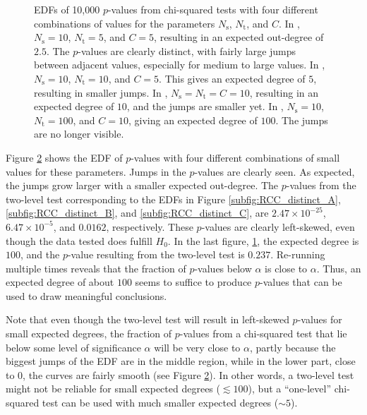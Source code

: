 \begin{figure}[h]
\begin{subfigure}[b]{0.49\textwidth}
    \label{subfig:RCC_distinct_D}
\end{subfigure}
    \caption[The effect of small parameter values on the EDF of $p$-values]{EDFs of 10,000 $p$-values from chi-squared tests with four different combinations of values for the parameters $N_\text{s}$, $N_\text{t}$, and $C$. In , $N_\text{s} = 10$, $N_\text{t} = 5$, and $C = 5$, resulting in an expected out-degree of $2.5$. The $p$-values are clearly distinct, with fairly large jumps between adjacent values, especially for medium to large values. In , $N_\text{s} = 10$, $N_\text{t} = 10$, and $C = 5$. This gives an expected degree of $5$, resulting in smaller jumps. In , $N_\text{s} = N_\text{t} = C = 10$, resulting in an expected degree of $10$, and the jumps are smaller yet. In , $N_\text{s} = 10$, $N_\text{t} = 100$, and $C = 10$, giving an expected degree of $100$. The jumps are no longer visible.}
  \label{fig:RCC_distinct}
\end{figure}
Figure \ref{fig:RCC_distinct} shows the EDF of $p$-values with four different combinations of small values for these parameters. Jumps in the $p$-values are clearly seen. As expected, the jumps grow larger with a smaller expected out-degree. The $p$-values from the two-level test corresponding to the EDFs in Figure \ref{subfig:RCC_distinct_A}, \ref{subfig:RCC_distinct_B}, and \ref{subfig:RCC_distinct_C}, are $2.47\times 10^{-25}$, $6.47\times 10^{-5}$, and $0.0162$, respectively. These $p$-values are clearly left-skewed, even though the data tested does fulfill $H_0$. In the last figure, \ref{subfig:RCC_distinct_D}, the expected degree is $100$, and the $p$-value resulting from the two-level test is $0.237$. Re-running multiple times reveals that the fraction of $p$-values below $\alpha$ is close to $\alpha$. Thus, an expected degree of about $100$ seems to suffice to produce $p$-values that can be used to draw meaningful conclusions. 

Note that even though the two-level test will result in left-skewed $p$-values for small expected degrees, the fraction of $p$-values from a chi-squared test that lie below some level of significance $\alpha$ will be very close to $\alpha$, partly because the biggest jumps of the EDF are in the middle region, while in the lower part, close to $0$, the curves are fairly smooth (see Figure \ref{fig:RCC_distinct}). In other words, a two-level test might not be reliable for small expected degrees ($\lesssim 100$), but a ``one-level'' chi-squared test can be used with much smaller expected degrees ($\sim 5$).




